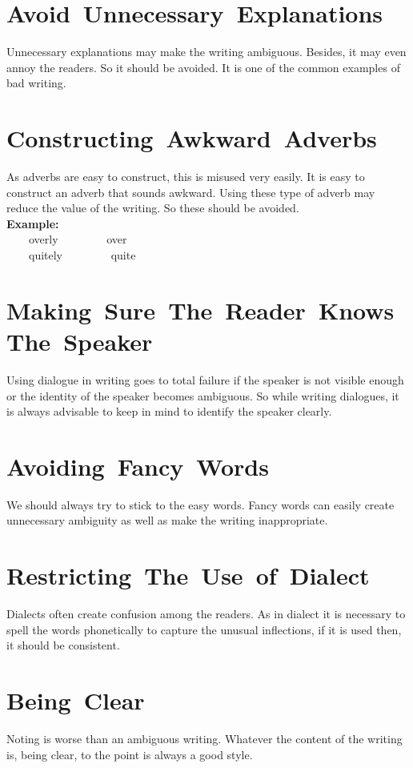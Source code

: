 \documentclass[12pt]{report}
\newcommand{\xmpl}{\textbf{Example:}\\} %
\newcommand{\indnt}{\ \ \ \ } %
\begin{document}
\section{\mbox{Avoid Unnecessary Explanations}}
Unnecessary explanations may make the writing ambiguous. Besides, it may even annoy the readers. So it should be avoided. It is one of the common examples of bad writing.


\section{\mbox{Constructing Awkward Adverbs}}
As adverbs are easy to construct, this is misused very easily. It is easy to construct an adverb that sounds awkward. Using these type of adverb may reduce the value of the writing. So these should be avoided.\\
\xmpl
\indnt overly \indnt \indnt over\\
\indnt quitely \indnt \indnt quite\\


\section{\mbox{Making Sure The Reader Knows The Speaker}}
Using dialogue in writing goes to total failure if the speaker is not visible enough or the identity of the speaker becomes ambiguous.
So while writing dialogues, it is always advisable to keep in mind to identify the speaker clearly.


\section{\mbox{Avoiding Fancy Words}}
We should always try to stick to the easy words. Fancy words can easily create unnecessary ambiguity as well as make the writing inappropriate.


\section{\mbox{Restricting The Use of Dialect}}
Dialects often create confusion among the readers. As in dialect it is necessary to spell the words phonetically to capture the unusual inflections, if it is used then, it should be consistent.


\section{\mbox{Being Clear}}
Noting is worse than an ambiguous writing. Whatever the content of the writing is, being clear, to the point is always a good style.
\end{document}
